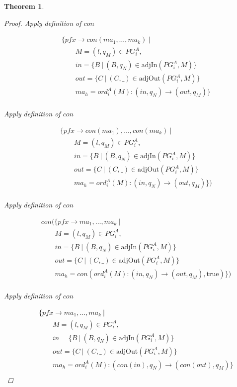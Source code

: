 \documentclass[twocolumn]{sig-alternate-10pt}
\newtheorem{thm}{Theorem}
\begin{document}
\begin{thm}
\begin{proof}
  Apply definition of $con$

  \[ \begin{array}{l}
     ~~~~~~~~~ \{ pfx \rightarrow con(ma_1, \dots, ma_k) ~\vert~ \\
     ~~~~~~~~~~~~~~~~~~ M = (l,q_M) \in PG^A_i, \\
     ~~~~~~~~~~~~~~~~~~ in = \{ B ~\vert~ (B,q_N) \in \text{adjIn}(PG^A_i,M) \} \\
     ~~~~~~~~~~~~~~~~~~ out = \{ C ~\vert~ (C,\_) \in \text{adjOut}(PG^A_i,M) \} \\
     ~~~~~~~~~~~~~~~~~~ ma_h = ord^A_i(M) : (in,q_N) \rightarrow (out,q_M) \} \\
  \end{array} \]%

  Apply definition of $con$

  \[ \begin{array}{l}
     ~~~~~~~~~ \{ pfx \rightarrow con(ma_1), \dots, con(ma_k) ~\vert~ \\
     ~~~~~~~~~~~~~~~~~~ M = (l,q_M) \in PG^A_i, \\
     ~~~~~~~~~~~~~~~~~~ in = \{ B ~\vert~ (B,q_N) \in \text{adjIn}(PG^A_i,M) \} \\
     ~~~~~~~~~~~~~~~~~~ out = \{ C ~\vert~ (C,\_) \in \text{adjOut}(PG^A_i,M) \} \\
     ~~~~~~~~~~~~~~~~~~ ma_h = ord^A_i(M) : (in,q_N) \rightarrow (out,q_M) \}) \\
  \end{array} \]%

  Apply definition of $con$

  \[ \begin{array}{l}
     ~~~~~~~~~ con(\{ pfx \rightarrow ma_1, \dots, ma_k ~\vert~ \\
     ~~~~~~~~~~~~~~~~~~ M = (l,q_M) \in PG^A_i, \\
     ~~~~~~~~~~~~~~~~~~ in = \{ B ~\vert~ (B,q_N) \in \text{adjIn}(PG^A_i,M) \} \\
     ~~~~~~~~~~~~~~~~~~ out = \{ C ~\vert~ (C,\_) \in \text{adjOut}(PG^A_i,M) \} \\
     ~~~~~~~~~~~~~~~~~~ ma_h = con(ord^A_i(M) : (in,q_N) \rightarrow (out,q_M), \text{true}) \}) \\
  \end{array} \]%

  Apply definition of $con$

  \[ \begin{array}{l}
     ~~~~~~~~~ \{ pfx \rightarrow ma_1, \dots, ma_k ~\vert~ \\
     ~~~~~~~~~~~~~~~~~~ M = (l,q_M) \in PG^A_i, \\
     ~~~~~~~~~~~~~~~~~~ in = \{ B ~\vert~ (B,q_N) \in \text{adjIn}(PG^A_i,M) \} \\
     ~~~~~~~~~~~~~~~~~~ out = \{ C ~\vert~ (C,\_) \in \text{adjOut}(PG^A_i,M) \} \\
     ~~~~~~~~~~~~~~~~~~ ma_h = ord^A_i(M) : (con(in),q_N) \rightarrow (con(out),q_M) \} \\
  \end{array} \]%


\end{proof}
\end{thm}
\end{document}
